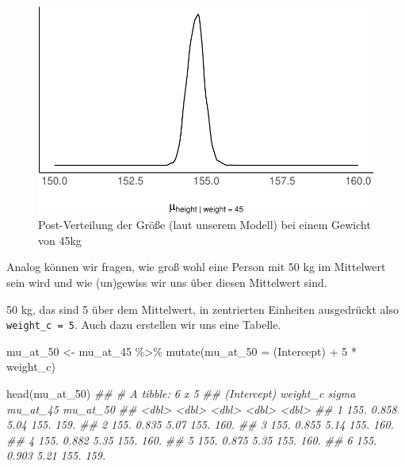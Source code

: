 \documentclass[
  a4paper,
  DIV=11]{scrreprt}
\newenvironment{Shaded}{\begin{snugshade}}{\end{snugshade}}
\newcommand{\AttributeTok}[1]{\textcolor[rgb]{0.40,0.45,0.13}{#1}}
\newcommand{\DecValTok}[1]{\textcolor[rgb]{0.68,0.00,0.00}{#1}}
\newcommand{\DocumentationTok}[1]{\textcolor[rgb]{0.37,0.37,0.37}{\textit{#1}}}
\newcommand{\FunctionTok}[1]{\textcolor[rgb]{0.28,0.35,0.67}{#1}}
\newcommand{\NormalTok}[1]{\textcolor[rgb]{0.00,0.23,0.31}{#1}}
\newcommand{\OtherTok}[1]{\textcolor[rgb]{0.00,0.23,0.31}{#1}}
\newcommand{\SpecialCharTok}[1]{\textcolor[rgb]{0.37,0.37,0.37}{#1}}
\newcommand{\StringTok}[1]{\textcolor[rgb]{0.13,0.47,0.30}{#1}}
\theoremstyle{definition}
\theoremstyle{remark}
\begin{document}
\begin{figure}

{\centering \includegraphics{./lineare-modelle_files/figure-pdf/fig-mu-at-45-1.pdf}

}

\caption{\label{fig-mu-at-45}Post-Verteilung der Größe (laut unserem
Modell) bei einem Gewicht von 45kg}

\end{figure}

Analog können wir fragen, wie groß wohl eine Person mit 50 kg im
Mittelwert sein wird und wie (un)gewiss wir uns über diesen Mittelwert
sind.

50 kg, das sind 5 über dem Mittelwert, in zentrierten Einheiten
ausgedrückt also \texttt{weight\_c\ =\ 5}. Auch dazu erstellen wir uns
eine Tabelle.

\begin{Shaded}
\begin{Highlighting}[]
\NormalTok{mu\_at\_50 }\OtherTok{\textless{}{-}}
\NormalTok{  mu\_at\_45 }\SpecialCharTok{\%\textgreater{}\%} 
  \FunctionTok{mutate}\NormalTok{(}\AttributeTok{mu\_at\_50 =} \StringTok{\textasciigrave{}}\AttributeTok{(Intercept)}\StringTok{\textasciigrave{}} \SpecialCharTok{+} \DecValTok{5} \SpecialCharTok{*}\NormalTok{ weight\_c)}

\FunctionTok{head}\NormalTok{(mu\_at\_50)}
\DocumentationTok{\#\# \# A tibble: 6 x 5}
\DocumentationTok{\#\#   \textasciigrave{}(Intercept)\textasciigrave{} weight\_c sigma mu\_at\_45 mu\_at\_50}
\DocumentationTok{\#\#           \textless{}dbl\textgreater{}    \textless{}dbl\textgreater{} \textless{}dbl\textgreater{}    \textless{}dbl\textgreater{}    \textless{}dbl\textgreater{}}
\DocumentationTok{\#\# 1          155.    0.858  5.04     155.     159.}
\DocumentationTok{\#\# 2          155.    0.835  5.07     155.     160.}
\DocumentationTok{\#\# 3          155.    0.855  5.14     155.     160.}
\DocumentationTok{\#\# 4          155.    0.882  5.35     155.     160.}
\DocumentationTok{\#\# 5          155.    0.875  5.35     155.     160.}
\DocumentationTok{\#\# 6          155.    0.903  5.21     155.     159.}
\end{Highlighting}
\end{Shaded}
\end{document}
